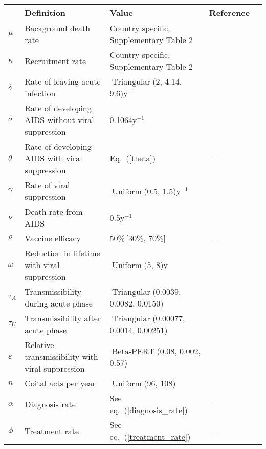 \documentclass{article}
\DeclareMathOperator{\Uniform}{Uniform}
\DeclareMathOperator{\Triangular}{Triangular}
\DeclareMathOperator{\BetaPERT}{Beta-PERT}
\begin{document}
\begin{table}
  \begin{center}
    \begin{tabularx}{\textwidth}{lXlll}
      \hline
      & Definition & Value & Reference \\
      \hline
      $\mu$ & Background death rate
      & Country specific, Supplementary Table 2
      & \cite{World_Development_Indicators2013-ee} \\
      $\kappa$ & Recruitment rate
      & Country specific, Supplementary Table 2
      & \cite{World_Development_Indicators2013-ee, WorldBankpg} \\
      $\delta$	& Rate of leaving acute infection
      & $\Triangular$(2, 4.14, 9.6)\;y$^{-1}$
      & \cite{Hollingsworth2008-iy} \\
      $\sigma$	& Rate of developing AIDS without viral suppression
      & 0.1064\;y$^{-1}$ & \cite{Morgan2002-cq} \\
      $\theta$ & Rate of developing AIDS with viral suppression
      & Eq.~(\ref{theta}) & --- \\
      $\gamma$ & Rate of viral suppression
      & $\Uniform$(0.5, 1.5)\;y$^{-1}$
      & \cite{Currie2009-yz} \\
      $\nu$ & Death rate from AIDS & 0.5\;y$^{-1}$
      & \cite{Morgan2002-cq} \\
      $\rho$ & Vaccine efficacy & 50\%\,[30\%, 70\%] & --- \\
      $\omega$	& Reduction in lifetime with viral suppression
      & $\Uniform$(5, 8)\;y
      & \cite{Samji2013-kf, Unaids2014-ue} \\
      $\tau_{A}$ & Transmissibility during acute phase
      & $\Triangular$(0.0039, 0.0082, 0.0150)
      & \cite{Wawer2005-us, Skarbinski2015-ni}\\
      $\tau_{U}$ & Transmissibility after acute phase
      & $\Triangular$(0.00077, 0.0014, 0.00251)
      & \cite{Hughes2012-so} \\
      $\varepsilon$ & Relative transmissibility with
      viral suppression & $\BetaPERT$(0.08, 0.002, 0.57)
      & \cite{Donnell2010-xo, attia_2009, wilson_2012, jia_2013,
        rodger_2016} \\
      $n$ & Coital acts per year & $\Uniform$(96, 108)
      & \cite{Wawer2005-us, Abdool_Karim2010-cm}\\
      $\alpha$ & Diagnosis rate & See eq.~(\ref{diagnosis_rate}) & --- \\
      $\phi$ & Treatment rate & See eq.~(\ref{treatment_rate}) & --- \\

\end{tabularx}
\end{center}
\end{table}
\end{document}
